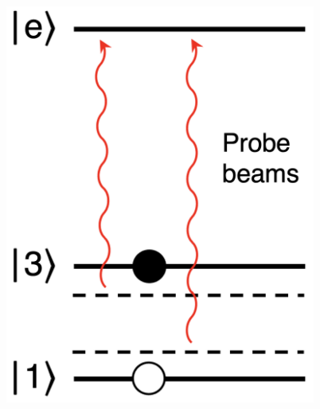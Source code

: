 \documentclass[26pt, paperwidth=36in,paperheight=48in]{tikzposter} %
\begin{document}
\begin{columns}
{\begin{minipage}{0.26\textwidth}
	\end{minipage}
	\hspace{01.0cm}
	\begin{minipage}{0.15\textwidth}
	\includegraphics[width=0.8\textwidth]{figures_retreat/polrot_light_setup.png}
	\end{minipage}
	\hspace{-4.0cm}
	\begin{minipage}{0.15\textwidth}
		\centering
		\\
		\vspace{1.5cm}

\end{minipage}}
\end{columns}
\end{document}
